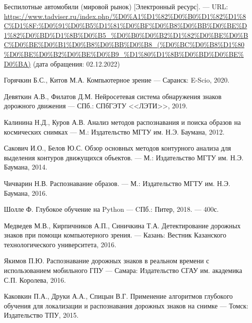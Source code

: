 
\renewcommand\bibname{СПИСОК ИСПОЛЬЗОВАННЫХ ИСТОЧНИКОВ}
\begin{thebibliography}{}

 Беспилотные автомобили (мировой рынок) [Электронный ресурс]. --- URL: \url{https://www.tadviser.ru/index.php/%D0%A1%D1%82%D0%B0%D1%82%D1%8C%D1%8F:%D0%91%D0%B5%D1%81%D0%BF%D0%B8%D0%BB%D0%BE%D1%82%D0%BD%D1%8B%D0%B5_%D0%B0%D0%B2%D1%82%D0%BE%D0%BC%D0%BE%D0%B1%D0%B8%D0%BB%D0%B8_(%D0%BC%D0%B8%D1%80%D0%BE%D0%B2%D0%BE%D0%B9_%D1%80%D1%8B%D0%BD%D0%BE%D0%BA)} (дата обращения: 02.12.2022)

 Горячкин Б.С., Китов М.А. Компьютерное зрение --- Саранск: E-Scio, 2020.

 Девяткин А.В., Филатов Д.М. Нейросетевая система обнаружения знаков дорожного движения --- СПб.: СПбГЭТУ <<ЛЭТИ>>, 2019.

 Калинина Н.Д., Куров А.В. Анализ методов распознавания и поиска образов на космических снимках --- М.: Издательство МГТУ им. Н.Э. Баумана, 2012.

 Сакович И.О., Белов Ю.С. Обзор основных методов контурного анализа для выделения контуров движущихся объектов. --- М.: Издательство МГТУ им. Н.Э. Баумана, 2014.

 Чичварин Н.В. Распознавание образов. --- М.: Издательство МГТУ им. Н.Э. Баумана, 2016.

 Шолле Ф. Глубокое обучение на Python --- CПб.: Питер, 2018. --- 400с.

 Медведев М.В., Кирпичников А.П., Синичкина Т.А. Детектирование дорожных знаков при помощи компьютерного зрения. --- Казань: Вестник Казанского технологического университета, 2016.

 Якимов П.Ю. Распознавание дорожных знаков в реальном времени с использованием мобильного ГПУ --- Самара: Издательство СГАУ им. академика С.П. Королева, 2016.

 Каковкин П.А., Друки А.А., Спицын В.Г. Применение алгоритмов глубокого обучения для локализации и распознавания дорожных знаков на снимке --- Томск: Издательство ТПУ, 2015.

\end{thebibliography}


